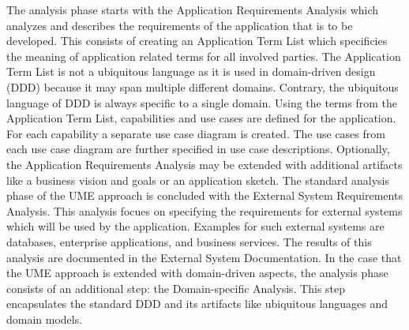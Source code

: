 The analysis phase starts with the Application Requirements Analysis
which analyzes and describes the requirements of the application that is to be developed.
This consists of creating an Application Term List which specificies the meaning
of application related terms for all involved parties. The Application Term List
is not a ubiquitous language as it is used in domain-driven design (DDD) because it
may span multiple different domains. Contrary, the ubiquitous language of DDD is always
specific to a single domain. Using the terms from the Application Term List,
capabilities and use cases are defined for the application. 
For each capability a separate use case diagram is created.
The use cases from each use case diagram are further specified in use case descriptions.
Optionally, the Application Requirements Analysis may be extended with additional artifacts
like a business vision and goals or an application sketch.
The standard analysis phase of the UME approach is concluded with the External System Requirements Analysis.
This analysis focues on specifying the requirements for external systems which will be used
by the application. Examples for such external systems are databases, enterprise applications,
and business services. The results of this analysis are documented in the External System Documentation.
In the case that the UME approach is extended with domain-driven aspects,
the analysis phase consists of an additional step: the Domain-specific Analysis.
This step encapsulates the standard DDD and its artifacts like ubiquitous languages
and domain models. %


